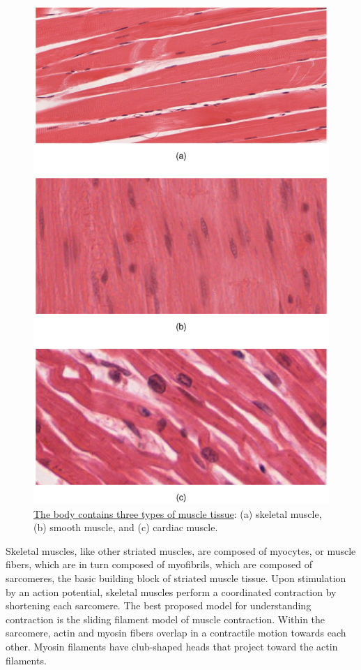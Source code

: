 \begin{figure}

{\centering \includegraphics[width=0.7\linewidth]{./figures/locomotion/414_Skeletal_Smooth_Cardiac} 

}

\caption{\href{https://upload.wikimedia.org/wikipedia/commons/e/e5/414_Skeletal_Smooth_Cardiac.jpg}{The body contains three types of muscle tissue}: (a) skeletal muscle, (b) smooth muscle, and (c) cardiac muscle.}\label{fig:threetypesofmuscle}
\end{figure}

Skeletal muscles, like other striated muscles, are composed of myocytes, or muscle fibers, which are in turn composed of myofibrils, which are composed of sarcomeres, the basic building block of striated muscle tissue. Upon stimulation by an action potential, skeletal muscles perform a coordinated contraction by shortening each sarcomere. The best proposed model for understanding contraction is the sliding filament model of muscle contraction. Within the sarcomere, actin and myosin fibers overlap in a contractile motion towards each other. Myosin filaments have club-shaped heads that project toward the actin filaments.



